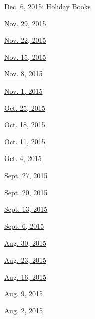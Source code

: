 \href{http://www.nytimes3xbfgragh.onion/indexes/2015/12/06/books/review/index.html}{Dec.
6, 2015: Holiday Books}

\href{http://www.nytimes3xbfgragh.onion/indexes/2015/11/29/books/review/index.html}{Nov.
29, 2015}

\href{http://www.nytimes3xbfgragh.onion/indexes/2015/11/22/books/review/index.html}{Nov.
22, 2015}

\href{http://www.nytimes3xbfgragh.onion/indexes/2015/11/15/books/review/index.html}{Nov.
15, 2015}

\href{http://www.nytimes3xbfgragh.onion/indexes/2015/11/08/books/review/index.html}{Nov.
8, 2015}

\href{http://www.nytimes3xbfgragh.onion/indexes/2015/11/01/books/review/index.html}{Nov.
1, 2015}

\href{http://www.nytimes3xbfgragh.onion/indexes/2015/10/25/books/review/index.html}{Oct.
25, 2015}

\href{http://www.nytimes3xbfgragh.onion/indexes/2015/10/18/books/review/index.html}{Oct.
18, 2015}

\href{http://www.nytimes3xbfgragh.onion/indexes/2015/10/11/books/review/index.html}{Oct.
11, 2015}

\href{http://www.nytimes3xbfgragh.onion/indexes/2015/10/04/books/review/index.html}{Oct.
4, 2015}

\href{http://www.nytimes3xbfgragh.onion/indexes/2015/09/27/books/review/index.html}{Sept.
27, 2015}

\href{http://www.nytimes3xbfgragh.onion/indexes/2015/09/20/books/review/index.html}{Sept.
20, 2015}

\href{http://www.nytimes3xbfgragh.onion/indexes/2015/09/13/books/review/index.html}{Sept.
13, 2015}

\href{http://www.nytimes3xbfgragh.onion/indexes/2015/09/06/books/review/index.html}{Sept.
6, 2015}

\href{http://www.nytimes3xbfgragh.onion/indexes/2015/08/30/books/review/index.html}{Aug.
30, 2015}

\href{http://www.nytimes3xbfgragh.onion/indexes/2015/08/23/books/review/index.html}{Aug.
23, 2015}

\href{http://www.nytimes3xbfgragh.onion/indexes/2015/08/16/books/review/index.html}{Aug.
16, 2015}

\href{http://www.nytimes3xbfgragh.onion/indexes/2015/08/09/books/review/index.html}{Aug.
9, 2015}

\href{http://www.nytimes3xbfgragh.onion/indexes/2015/08/02/books/review/index.html}{Aug.
2, 2015}

